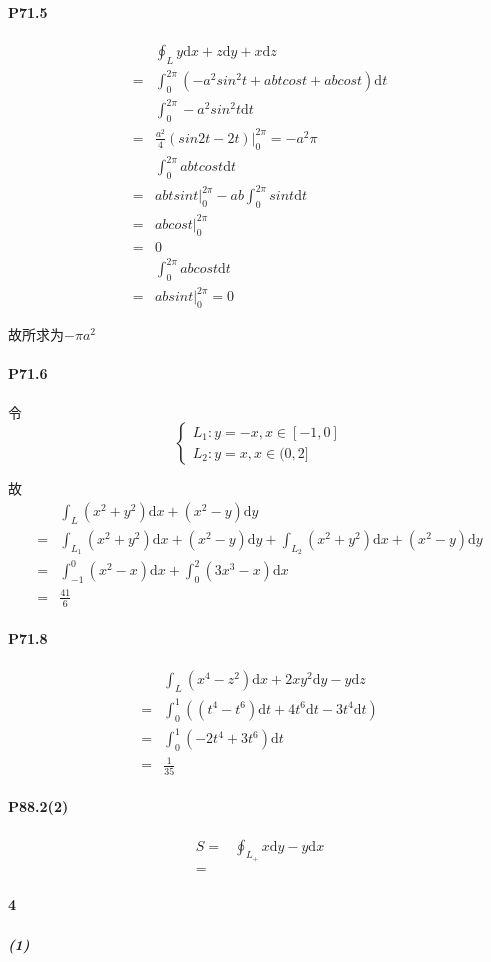 \documentclass[UTF8]{ctexart}
\begin{document}
\paragraph*{P71.5}
\begin{align*}
    &\oint_{L} y \mathrm{d}x + z \mathrm{d}y + x \mathrm{d}z \\
    =& \int_{0}^{2\pi} (-a^2sin^2t + abtcost + abcost) \mathrm{d}t \\
    & \int_{0}^{2\pi} -a^2sin^2t \mathrm{d}t \\
    =& \frac{a^2}{4} (sin2t - 2t)\big|_{0}^{2\pi} = -a^2\pi  \\
    & \int_{0}^{2\pi} abtcost  \mathrm{d}t \\
    =& abtsint \big|_{0}^{2\pi}  - ab \int_{0}^{2\pi} sint \mathrm{d}t \\
    =& abcost \big|_{0}^{2\pi} \\
    =& 0 \\
     & \int_{0}^{2\pi}abcost \mathrm{d}t \\
    =& absint \big|_{0}^{2\pi} = 0
\end{align*}

故所求为$-\pi a^2$
\paragraph*{P71.6}
令
\begin{equation*}
    \begin{cases}
        L_1: y=-x ,x \in [-1, 0] \\
        L_2: y=x, x \in (0, 2]
    \end{cases}
\end{equation*}

故
\begin{align*}
  &\int_{L}^{} (x^2+y^2) \mathrm{d}x + (x^2 - y) \mathrm{d}y \\
  =& \int_{L_1}^{} (x^2+y^2) \mathrm{d}x + (x^2 - y) \mathrm{d}y + 
  \int_{L_2}^{} (x^2+y^2) \mathrm{d}x + (x^2 - y) \mathrm{d}y \\
  =& \int_{-1}^{0} (x^2-x) \mathrm{d}x + \int_{0}^{2} (3x^3 - x)\mathrm{d}x \\
  =& \frac{41}{6} 
\end{align*}
\paragraph*{P71.8}
\begin{align*}
    &\int_{L}^{} (x^4-z^2)\mathrm{d}x+2xy^2 \mathrm{d}y - y \mathrm{d}z \\
    =& \int_{0}^{1} ((t^4-t^6)\mathrm{d}t + 4t^6 \mathrm{d}t - 3t^4 \mathrm{d}t) \\
    =& \int_{0}^{1} (-2t^4+3t^6) \mathrm{d}t \\
    =& \frac{1}{35} 
\end{align*}
\paragraph*{P88.2(2)}
\begin{align*}
    S =& \oint_{L_+} x \mathrm{d}y -y \mathrm{d}x \\
    =& 
\end{align*}
\paragraph*{4}
\subparagraph*{(1)}
\begin{align*}
\end{align*}
\end{document}
